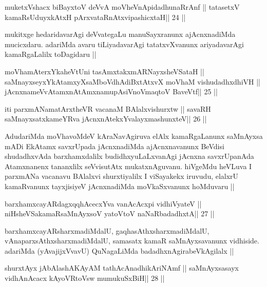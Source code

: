 
\begin{shl}
muketxVshacx biBayxtoV deVvA moVheVnApidadhunaRrAnf ||
tatasetxV kamaRsUduyxkAtxH pArxvataRnAtxvipashicxtaH\hfill || 24 ||
\end{shl}

\begin{artha}
mukitxge hedaridavarAgi deVvategaLu manuSayxranunx ajAcnxnadiMda
mucicxdaru. adariMda avaru tiLiyadavarAgi tatatxvXvanunx ariyadavarAgi
kamaRgaLalilx toDagidaru ||
\end{artha}

\begin{shl}
moVhamAterxYkaheVtUni tasAmxtakxmARNayxsheVSataH ||
saMnayxseyxYkAtamxyXsaMboVdhAdiBxtAtxvX moVhaM vishudadhxdhiVH ||
jAcnxnameVvA\s\s tamxnA\s\s tAmxnamupAsiVnoV\s maqtoV BaveVtf\hfill || 25 ||
\end{shl}

\begin{shl}
iti parxmANamatArxtheVR vacanaM BAlalxvishurxtw ||
savaRH saMnayxsatxkameYRva jAcnxnAtekxYvalayxmashunxteV\hfill || 26 ||
\end{shl}

\begin{artha}
AdudariMda moVhavoMdeV kAraNavAgiruva elAlx kamaRgaLanunx saMnAyxsa
mADi EkAtamx savxrUpada jAcnxnadiMda ajAcnxnavanunx BeVdisi
shudadhxvAda barxhamxdalilx budidhxyuLaLxvanAgi jAcnxna savxrUpanAda
Atamxnanenx tananxlilx seVvisutAtx mukatxnAguvanu. hiVgeMdu heVLuva I
parxmANa vacanavu BAlalxvi shurxtiyalilx I viSayakekx iruvudu, elalxrU
kamaRvanunx tayxjisiyeV jAcnxnadiMda moVkaSxvanunx hoMduvaru ||
\end{artha}


\begin{shl}
barxhamxcayARdagxqqhAcecxYva vanAcAcxpi vidhiVyateV ||
niHsheVSakamaRsaMnAyxsoV yatoV\s toV naNaRbadadhxtA\hfill || 27 ||
\end{shl}

\begin{artha}
barxhamxcayARsharxmadiMdalU, gaqhasAthxsharxmadiMdalU, 
vAnaparxsAthxsharxmadiMdalU, samasatx kamaR saMnAyxsavanunx vidhiside. adariMda
(yAvajijxVvavU) QuNagaLiMda badadhxnAgirabeVkAgilalx ||
\end{artha}

\begin{shl}
\footnotemark[1]shurxtAyx jAbAlashAKAyAM tathAcAnadhikAriNAmf ||
saMnAyxsasayx vidhAnAcacx kAyoVR\s toV\s sw mumukuSxBiH\hfill || 28 ||
\end{shl}

